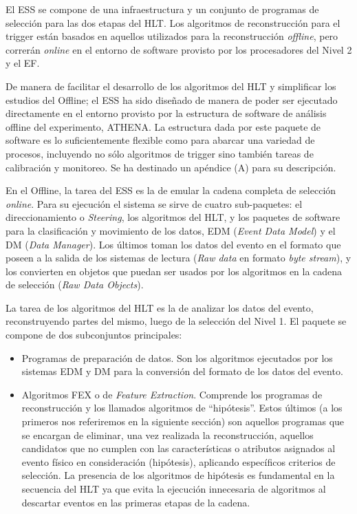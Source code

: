  El ESS se compone de una infraestructura y un conjunto de programas de selecci\'on para las dos etapas del HLT.  Los algoritmos de reconstrucci\'on para el trigger est\'an basados en aquellos utilizados para la reconstrucci\'on \emph{offline}, pero correr\'an \emph{online} en el entorno de software provisto por los procesadores del Nivel 2 y el EF. 

  De manera de facilitar el desarrollo de los algoritmos del HLT y simplificar los estudios del Offline; el ESS ha sido dise\~nado de manera de poder ser ejecutado directamente en el entorno provisto por la estructura de software de an\'alisis offline del experimento, ATHENA\cite{Athena}. La estructura dada por este paquete de software es lo suficientemente flexible como para abarcar una variedad de procesos, incluyendo no s\'olo algoritmos de trigger sino tambi\'en tareas de calibraci\'on y monitoreo. Se ha destinado un ap\'endice (A) para su descripci\'on.
 
  En el Offline, la tarea del ESS es la de emular la cadena completa de selecci\'on \emph{online}. Para su ejecuci\'on el sistema se sirve de cuatro sub-paquetes: el direccionamiento o \emph{Steering}, los algoritmos del HLT, y los paquetes de software para la clasificaci\'on y movimiento de los datos, EDM (\emph{Event Data Model}) y el DM (\emph{Data Manager}). Los \'ultimos toman los datos del evento en el formato que poseen a la salida de los sistemas de lectura (\emph{Raw data} en formato \emph{byte stream}), y los convierten en objetos que puedan ser usados por los algoritmos en la cadena de selecci\'on (\emph{Raw Data Objects}).

  La tarea de los algoritmos del HLT es la de analizar los datos del evento, reconstruyendo partes del mismo, luego de la selecci\'on del Nivel 1. El paquete se compone de dos subconjuntos principales:
\begin{itemize}
   \item Programas de preparaci\'on de datos. Son los algoritmos ejecutados por los sistemas EDM y DM para la conversi\'on del formato de los datos del evento. 
   \item Algoritmos FEX o de \emph{Feature Extraction}. Comprende los programas de reconstrucci\'on y los llamados algoritmos de ``hip\'otesis''. Estos \'ultimos (a los primeros nos referiremos en la siguiente secci\'on) son aquellos programas que se encargan de eliminar, una vez realizada la reconstrucci\'on, aquellos candidatos que no cumplen con las caracter\'isticas o atributos asignados al evento f\'isico en consideraci\'on (hip\'otesis), aplicando espec\'ificos criterios de selecci\'on. La presencia de los algoritmos de hip\'otesis es fundamental en la secuencia del HLT ya que evita la ejecuci\'on innecesaria de algoritmos al descartar eventos en las primeras etapas de la cadena.
\end{itemize}

